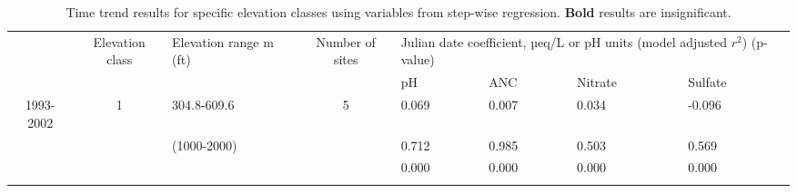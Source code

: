\begin{table}[p]\scriptsize
\caption{Time trend results for specific elevation classes using variables from step-wise regression. \textbf{Bold} results are insignificant.}
\begin{tabular}{cclcllll}
 \hline\noalign{\smallskip}
\multicolumn{1}{m{.5cm}}{Time set} & \multicolumn{1}{m{1cm}}{Elevation class} &\multicolumn{1}{m{2cm}}{ Elevation range m (ft)} & \multicolumn{1}{m{1cm}}{Number of sites} & \multicolumn{4}{m{8cm}}{Julian date coefficient, µeq/L or pH units (model adjusted $r^2$) (p-value)}   \\ \cline{5-8}\noalign{\smallskip}
                                                               &                                                                 &                                                                                &                                                                       & \multicolumn{ 1}{m{2cm}}{pH} & \multicolumn{1}{m{2cm}}{ANC} & \multicolumn{1}{m{2cm}}{Nitrate} & \multicolumn{1}{m{2cm}}{Sulfate} \\ 
 \hline\noalign{\smallskip}
1993-2002                                              & 1                                                              & 304.8-609.6                                                           & 5                                                                    &  0.069                                       & 0.007                                          & 0.034                                              & -0.096  \\ 
                                                               &                                                                 & (1000-2000)                                                           &                                                                       &  0.712                                       & 0.985                                           & 0.503                                             & 0.569  \\ 
                                                               &                                                                 &                                                                                &                                                                        &  0.000                                      & 0.000                                           & 0.000                                              & 0.000  \\ \cline{5-8}\noalign{\smallskip}

\end{tabular}
\end{table}
